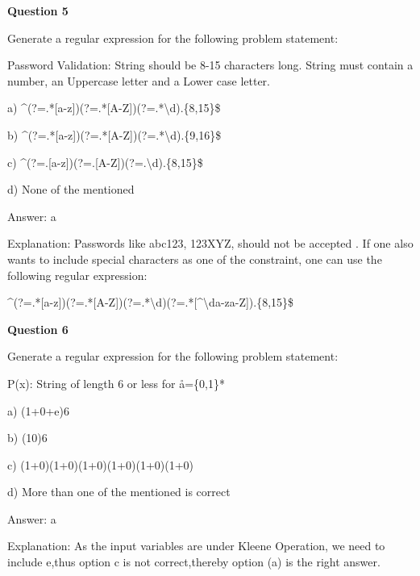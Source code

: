 \documentclass{article}
\begin{document}
\begin{mdframed}[linewidth=1pt, roundcorner=5pt, linecolor=gray!30, backgroundcolor=gray!5]
\textbf{Question 5} 

Generate a regular expression for the following problem statement:

Password Validation: String should be 8-15 characters long. String must contain a number, an Uppercase letter and a Lower case letter.

a) \textasciicircum{}(?=.*[a-z])(?=.*[A-Z])(?=.*\textbackslash d).\{8,15\}\$

b) \textasciicircum{}(?=.*[a-z])(?=.*[A-Z])(?=.*\textbackslash d).\{9,16\}\$

c) \textasciicircum{}(?=.[a-z])(?=.[A-Z])(?=.\textbackslash d).\{8,15\}\$

d) None of the mentioned
\vspace{5pt} \par
\begin{tcolorbox}[colback=green!5, colframe=green!40!black, title=Solution]
Answer: a

Explanation: Passwords like abc123, 123XYZ, should not be accepted . If one also wants to include special characters as one of the constraint, one can use the following regular expression:

               \textasciicircum{}(?=.*[a-z])(?=.*[A-Z])(?=.*\textbackslash d)(?=.*[\textasciicircum{}\textbackslash da-za-Z]).\{8,15\}\$
\end{tcolorbox}
\end{mdframed}

\begin{mdframed}[linewidth=1pt, roundcorner=5pt, linecolor=gray!30, backgroundcolor=gray!5]
\textbf{Question 6} 

Generate a regular expression for the following problem statement:

P(x): String of length 6 or less for å=\{0,1\}*

a) (1+0+e)6

b) (10)6

c) (1+0)(1+0)(1+0)(1+0)(1+0)(1+0)

d) More than one of the mentioned is correct
\vspace{5pt} \par
\begin{tcolorbox}[colback=green!5, colframe=green!40!black, title=Solution]
Answer: a

Explanation: As the input variables are under Kleene Operation, we need to include e,thus option c is not correct,thereby option (a) is the right answer.
\end{tcolorbox}
\end{mdframed}
\newpage
\end{document}
